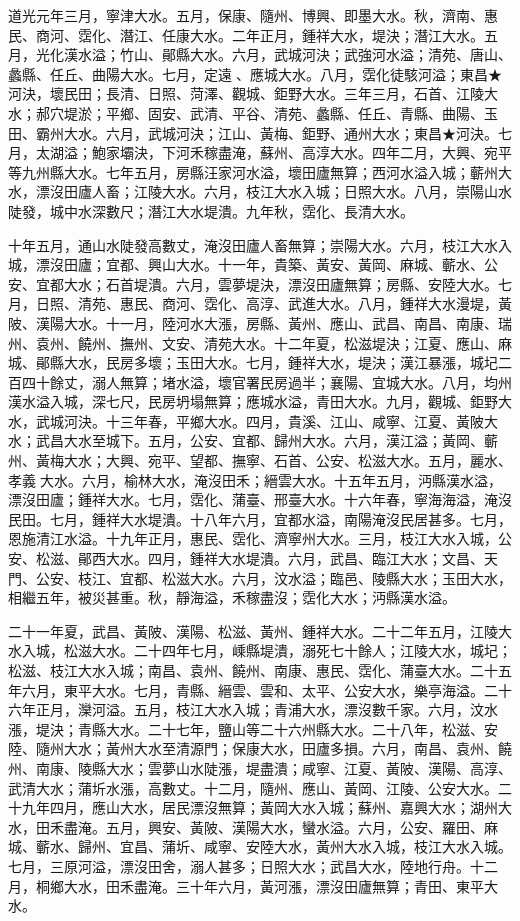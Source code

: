 \begin{pinyinscope}
道光元年三月，寧津大水。五月，保康、隨州、博興、即墨大水。秋，濟南、惠民、商河、霑化、潛江、任康大水。二年正月，鍾祥大水，堤決；潛江大水。五月，光化漢水溢；竹山、鄖縣大水。六月，武城河決；武強河水溢；清苑、唐山、蠡縣、任丘、曲陽大水。七月，定遠、應城大水。八月，霑化徒駭河溢；東昌★河決，壞民田；長清、日照、菏澤、觀城、鉅野大水。三年三月，石首、江陵大水；郝穴堤淤；平鄉、固安、武清、平谷、清苑、蠡縣、任丘、青縣、曲陽、玉田、霸州大水。六月，武城河決；江山、黃梅、鉅野、通州大水；東昌★河決。七月，太湖溢；鮑家壩決，下河禾稼盡淹，蘇州、高淳大水。四年二月，大興、宛平等九州縣大水。七年五月，房縣汪家河水溢，壞田廬無算；西河水溢入城；蘄州大水，漂沒田廬人畜；江陵大水。六月，枝江大水入城；日照大水。八月，崇陽山水陡發，城中水深數尺；潛江大水堤潰。九年秋，霑化、長清大水。

十年五月，通山水陡發高數丈，淹沒田廬人畜無算；崇陽大水。六月，枝江大水入城，漂沒田廬；宜都、興山大水。十一年，貴築、黃安、黃岡、麻城、蘄水、公安、宜都大水；石首堤潰。六月，雲夢堤決，漂沒田廬無算；房縣、安陸大水。七月，日照、清苑、惠民、商河、霑化、高淳、武進大水。八月，鍾祥大水漫堤，黃陂、漢陽大水。十一月，陸河水大漲，房縣、黃州、應山、武昌、南昌、南康、瑞州、袁州、饒州、撫州、文安、清苑大水。十二年夏，松滋堤決；江夏、應山、麻城、鄖縣大水，民房多壞；玉田大水。七月，鍾祥大水，堤決；漢江暴漲，城圮二百四十餘丈，溺人無算；堵水溢，壞官署民房過半；襄陽、宜城大水。八月，均州漢水溢入城，深七尺，民房坍塌無算；應城水溢，青田大水。九月，觀城、鉅野大水，武城河決。十三年春，平鄉大水。四月，貴溪、江山、咸寧、江夏、黃陂大水；武昌大水至城下。五月，公安、宜都、歸州大水。六月，漢江溢；黃岡、蘄州、黃梅大水；大興、宛平、望都、撫寧、石首、公安、松滋大水。五月，麗水、孝義大水。六月，榆林大水，淹沒田禾；縉雲大水。十五年五月，沔縣漢水溢，漂沒田廬；鍾祥大水。七月，霑化、蒲臺、邢臺大水。十六年春，寧海海溢，淹沒民田。七月，鍾祥大水堤潰。十八年六月，宜都水溢，南陽淹沒民居甚多。七月，恩施清江水溢。十九年正月，惠民、霑化、濟寧州大水。三月，枝江大水入城，公安、松滋、鄖西大水。四月，鍾祥大水堤潰。六月，武昌、臨江大水；文昌、天門、公安、枝江、宜都、松滋大水。六月，汶水溢；臨邑、陵縣大水；玉田大水，相繼五年，被災甚重。秋，靜海溢，禾稼盡沒；霑化大水；沔縣漢水溢。

二十一年夏，武昌、黃陂、漢陽、松滋、黃州、鍾祥大水。二十二年五月，江陵大水入城，松滋大水。二十四年七月，嵊縣堤潰，溺死七十餘人；江陵大水，城圮；松滋、枝江大水入城；南昌、袁州、饒州、南康、惠民、霑化、蒲臺大水。二十五年六月，東平大水。七月，青縣、縉雲、雲和、太平、公安大水，樂亭海溢。二十六年正月，灤河溢。五月，枝江大水入城；青浦大水，漂沒數千家。六月，汶水漲，堤決；青縣大水。二十七年，鹽山等二十六州縣大水。二十八年，松滋、安陸、隨州大水；黃州大水至清源門；保康大水，田廬多損。六月，南昌、袁州、饒州、南康、陵縣大水；雲夢山水陡漲，堤盡潰；咸寧、江夏、黃陂、漢陽、高淳、武清大水；蒲圻水漲，高數丈。十二月，隨州、應山、黃岡、江陵、公安大水。二十九年四月，應山大水，居民漂沒無算；黃岡大水入城；蘇州、嘉興大水；湖州大水，田禾盡淹。五月，興安、黃陂、漢陽大水，蠻水溢。六月，公安、羅田、麻城、蘄水、歸州、宜昌、蒲圻、咸寧、安陸大水，黃州大水入城，枝江大水入城。七月，三原河溢，漂沒田舍，溺人甚多；日照大水；武昌大水，陸地行舟。十二月，桐鄉大水，田禾盡淹。三十年六月，黃河漲，漂沒田廬無算；青田、東平大水。


\end{pinyinscope}
